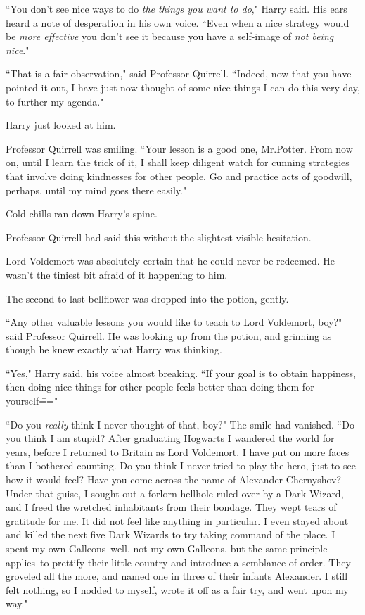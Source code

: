 ``You don't see nice ways to do \emph{the things you want to do}," Harry said. His ears heard a note of desperation in his own voice. ``Even when a nice strategy would be \emph{more effective} you don't see it because you have a self-image of \emph{not being nice}."

``That is a fair observation," said Professor Quirrell. ``Indeed, now that you have pointed it out, I have just now thought of some nice things I can do this very day, to further my agenda."

Harry just looked at him.

Professor Quirrell was smiling. ``Your lesson is a good one, Mr.\?Potter. From now on, until I learn the trick of it, I shall keep diligent watch for cunning strategies that involve doing kindnesses for other people. Go and practice acts of goodwill, perhaps, until my mind goes there easily."

Cold chills ran down Harry's spine.

Professor Quirrell had said this without the slightest visible hesitation.

Lord Voldemort was absolutely certain that he could never be redeemed. He wasn't the tiniest bit afraid of it happening to him.

The second-to-last bellflower was dropped into the potion, gently.

``Any other valuable lessons you would like to teach to Lord Voldemort, boy?" said Professor Quirrell. He was looking up from the potion, and grinning as though he knew exactly what Harry was thinking.

``Yes," Harry said, his voice almost breaking. ``If your goal is to obtain happiness, then doing nice things for other people feels better than doing them for yourself\==="

``Do you \emph{really} think I never thought of that, boy?" The smile had vanished. ``Do you think I am stupid? After graduating Hogwarts I wandered the world for years, before I returned to Britain as Lord Voldemort. I have put on more faces than I bothered counting. Do you think I never tried to play the hero, just to see how it would feel? Have you come across the name of Alexander Chernyshov? Under that guise, I sought out a forlorn hellhole ruled over by a Dark Wizard, and I freed the wretched inhabitants from their bondage. They wept tears of gratitude for me. It did not feel like anything in particular. I even stayed about and killed the next five Dark Wizards to try taking command of the place. I spent my own Galleons\---well, not my own Galleons, but the same principle applies\---to prettify their little country and introduce a semblance of order. They groveled all the more, and named one in three of their infants Alexander. I still felt nothing, so I nodded to myself, wrote it off as a fair try, and went upon my way."

